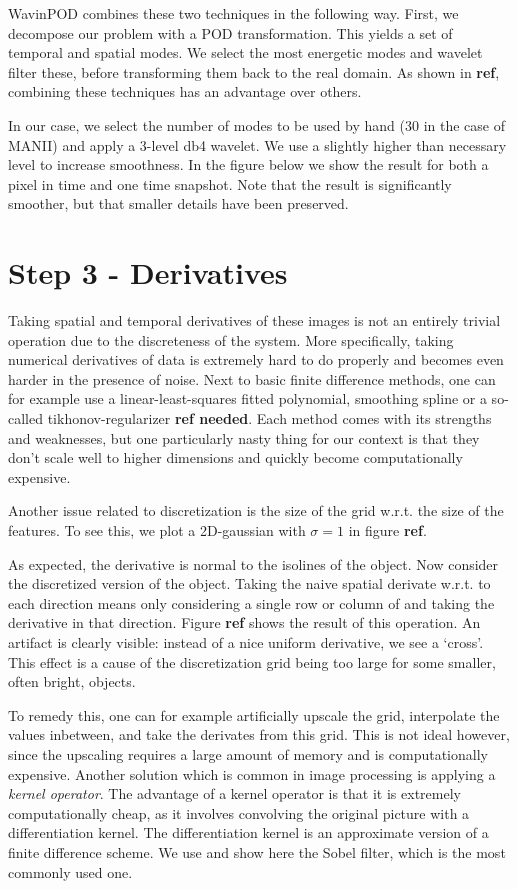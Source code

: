 \documentclass[12pt,a4paper,]{harvard-thesis}
\begin{document}
WavinPOD combines these two techniques in the following way. First, we
decompose our problem with a POD transformation. This yields a set of
temporal and spatial modes. We select the most energetic modes and
wavelet filter these, before transforming them back to the real domain.
As shown in \textbf{ref}, combining these techniques has an advantage
over others.

In our case, we select the number of modes to be used by hand (30 in the
case of MANII) and apply a 3-level db4 wavelet. We use a slightly higher
than necessary level to increase smoothness. In the figure below we show
the result for both a pixel in time and one time snapshot. Note that the
result is significantly smoother, but that smaller details have been
preserved.

\hypertarget{step-3---derivatives}{%
\section{Step 3 - Derivatives}\label{step-3---derivatives}}

Taking spatial and temporal derivatives of these images is not an
entirely trivial operation due to the discreteness of the system. More
specifically, taking numerical derivatives of data is extremely hard to
do properly and becomes even harder in the presence of noise. Next to
basic finite difference methods, one can for example use a
linear-least-squares fitted polynomial, smoothing spline or a so-called
tikhonov-regularizer \textbf{ref needed}. Each method comes with its
strengths and weaknesses, but one particularly nasty thing for our
context is that they don't scale well to higher dimensions and quickly
become computationally expensive.

Another issue related to discretization is the size of the grid w.r.t.
the size of the features. To see this, we plot a 2D-gaussian with
\(\sigma=1\) in figure \textbf{ref}.

As expected, the derivative is normal to the isolines of the object. Now
consider the discretized version of the object. Taking the naive spatial
derivate w.r.t. to each direction means only considering a single row or
column of and taking the derivative in that direction. Figure
\textbf{ref} shows the result of this operation. An artifact is clearly
visible: instead of a nice uniform derivative, we see a `cross'. This
effect is a cause of the discretization grid being too large for some
smaller, often bright, objects.

To remedy this, one can for example artificially upscale the grid,
interpolate the values inbetween, and take the derivates from this grid.
This is not ideal however, since the upscaling requires a large amount
of memory and is computationally expensive. Another solution which is
common in image processing is applying a \emph{kernel operator}. The
advantage of a kernel operator is that it is extremely computationally
cheap, as it involves convolving the original picture with a
differentiation kernel. The differentiation kernel is an approximate
version of a finite difference scheme. We use and show here the Sobel
filter, which is the most commonly used one.
\end{document}
